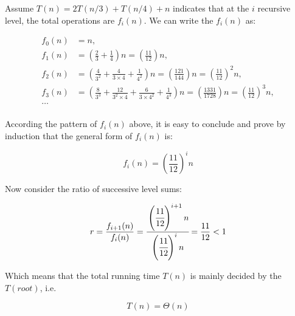 \begin{homeworkProblem}
\begin{homeworkSubProblem}[$T(n)=2T(n/3)+T(n/4)+n$]

Assume $T(n)=2T(n/3)+T(n/4)+n$ indicates that at the $i$ recursive level,
the total operations are $f_i(n)$. We can write the $f_i(n)$ as:

\begin{equation}
\begin{split}
f_0(n) & = n ,\\
f_1(n) & = \left(\frac{2}{3}+\frac{1}{4}\right) n
         = \left(\frac{11}{12}\right) n ,\\
f_2(n) & = \left(\frac{4}{3^2}+\frac{4}{3\times 4}+\frac{1}{4^2}\right) n
         = \left(\frac{121}{144}\right) n
         = \left(\frac{11}{12}\right)^2 n ,\\
f_3(n) & = \left(\frac{8}{3^3}+\frac{12}{3^2\times 4}+\frac{6}{3\times 4^2}
            +\frac{1}{4^3}\right) n
         = \left(\frac{1331}{1728}\right) n
         = \left(\frac{11}{12}\right)^3 n ,\\
\dotso \\ %
\end{split}
\end{equation}

According the pattern of $f_i(n)$ above, it is easy to conclude and prove
by induction that the general form of $f_i(n)$ is:

\begin{equation}
f_i(n) = \left(\frac{11}{12}\right)^i n
\end{equation}

Now consider the ratio of successive level sums:

\begin{equation}
r = \frac{f_{i+1}(n)}{f_i(n)}
  = \cfrac{\left(\cfrac{11}{12}\right)^{i+1} n}{\left(\cfrac{11}{12}\right)^i n}
  = \frac{11}{12}
  < 1
\end{equation}

Which means that the total running time $T(n)$ is mainly decided by the $T(root)$, i.e.

\begin{equation} \label{eq:6.3}
T(n) = \Theta(n)
\end{equation}

\end{homeworkSubProblem}

\begin{homeworkSubProblem}[$T(n)=T(n-1)+\sqrt{n}$]


\end{homeworkSubProblem}
\end{homeworkProblem}
